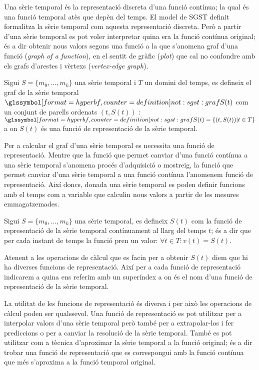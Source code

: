 Una sèrie temporal és la representació discreta d'una funció contínua;
la qual és una funció temporal atès que depèn del temps. El model de
SGST definit formalitza la sèrie temporal com aquesta
representació discreta. Però a partir d'una sèrie temporal es pot
voler interpretar quina era la funció contínua original; és a dir
obtenir nous valors segons una funció a la que s'anomena graf d'una
funció (\emph{graph of a function}), en el sentit de gràfic
(\emph{plot}) que cal no confondre amb els grafs d'arestes i vèrtexs
(\emph{vertex-edge graph}).

\begin{definition}%
  Sigui $S=\{m_0,\ldots,m_k\}$ una sèrie temporal i $T$ un domini del
  temps, es defineix el graf de la sèrie temporal
  $\glssymboldef{not:sgst:graf} S(t)$ com un conjunt de parells
  ordenats $(t,S(t))$ : $\glssymboldef{not:sgst:graf} S(t) = \{ (t,S(t)) |
  t\in T \}$ a on $S(t)$ és una funció de representació de la sèrie
  temporal.
\end{definition}

Per a calcular el graf d'una sèrie temporal es necessita una funció de
representació. Mentre que la funció que permet canviar d'una funció
contínua a una sèrie temporal s'anomena procés d'adquisició o
mostreig, la funció que permet canviar d'una sèrie temporal a una
funció contínua l'anomenem funció de representació.  Així doncs,
donada una sèrie temporal es poden definir funcions amb el temps com a
variable que calculin nous valors a partir de les mesures
emmagatzemades.
\begin{definition}
  Sigui $S=\{m_0,\ldots,m_k\}$ una sèrie temporal, es defineix $S(t)$
  com la funció de representació de la sèrie temporal contínuament al
  llarg del temps $t$; és a dir que per cada instant de temps la
  funció pren un valor: $\forall t\in T: v(t) = S(t)$. 

  Atenent a les operacions de càlcul que es facin per a obtenir $S(t)$
  diem que hi ha diverses funcions de representació. Així per a cada
  funció de representació indicarem a quina ens referim amb un
  superíndex  a on
   és el nom d'una funció de representació
  de la sèrie temporal.
\end{definition}

La utilitat de les funcions de representació és diversa i per això les
operacions de càlcul poden ser qualssevol. Una funció de representació
es pot utilitzar per a interpolar valors d'una sèrie temporal però
també per a extrapolar-los i fer prediccions o per a canviar la
resolució de la sèrie temporal. També es pot utilitzar com a tècnica
d'aproximar la sèrie temporal a la funció original; és a dir trobar
una funció de representació que es correspongui amb la funció contínua
que més s'aproxima a la funció temporal original.


